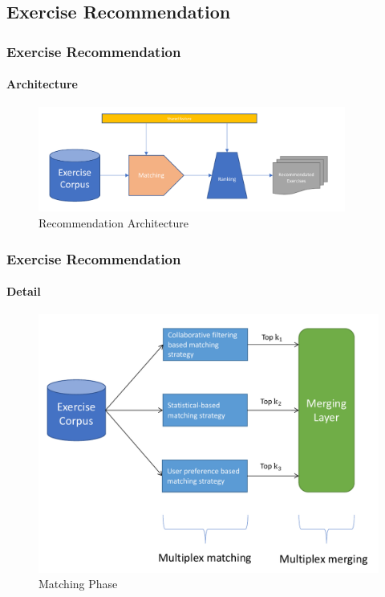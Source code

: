 \documentclass{beamer}
\begin{document}



\subsection{Exercise Recommendation}
\begin{frame}
  \frametitle{Exercise Recommendation}
  \framesubtitle{Architecture}
  \begin{figure}
    \includegraphics[width=0.9\textwidth]{figures/ch4-ov.pdf}
    \caption{Recommendation Architecture}
  \end{figure}
\end{frame}

\begin{frame}
  \frametitle{Exercise Recommendation}
  \framesubtitle{Detail}
  \begin{figure}
    \includegraphics[height=0.7\textheight]{figures/ch4-matching.pdf}
    \caption{Matching Phase}
  \end{figure}
\end{frame}
\end{document}

